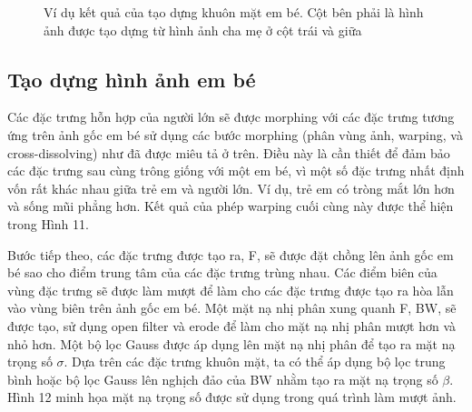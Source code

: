 \documentclass[conference]{IEEEtran}
\begin{document}
\begin{figure}[!ht]
\label{refhinh13}
\caption{Ví dụ kết quả của tạo dựng khuôn mặt em bé. Cột bên phải là hình ảnh được tạo dựng từ hình ảnh cha mẹ ở cột trái và giữa}
\end{figure}

\subsection{Tạo dựng hình ảnh em bé}
Các đặc trưng hỗn hợp của người lớn sẽ được morphing với các đặc trưng tương ứng trên ảnh gốc em bé sử dụng các bước morphing (phân vùng ảnh, warping, và cross-dissolving) như đã được miêu tả ở trên. Điều này là cần thiết để đảm bảo các đặc trưng sau cùng trông giống với một em bé, vì một số đặc trưng nhất định vốn rất khác nhau giữa trẻ em và người lớn. Ví dụ, trẻ em có tròng mắt lớn hơn và sống mũi phẳng hơn. Kết quả của phép warping cuối cùng này được thể hiện trong Hình 11.

Bước tiếp theo, các đặc trưng được tạo ra, F, sẽ được đặt chồng lên ảnh gốc em bé sao cho điểm trung tâm của các đặc trưng trùng nhau. Các điểm biên của vùng đặc trưng sẽ được làm mượt để làm cho các đặc trưng được tạo ra hòa lẫn vào vùng biên trên ảnh gốc em bé. Một mặt nạ nhị phân xung quanh F, BW, sẽ được tạo, sử dụng open filter và erode để làm cho mặt nạ nhị phân mượt hơn và nhỏ hơn. Một bộ lọc Gauss được áp dụng lên mặt nạ nhị phân để tạo ra mặt nạ trọng số $\sigma$. Dựa trên các đặc trưng khuôn mặt, ta có thể áp dụng bộ lọc trung bình hoặc bộ lọc Gauss lên nghịch đảo của BW nhằm tạo ra mặt nạ trọng số $\beta$. Hình 12 minh họa mặt nạ trọng số được sử dụng trong quá trình làm mượt ảnh.  
\end{document}
